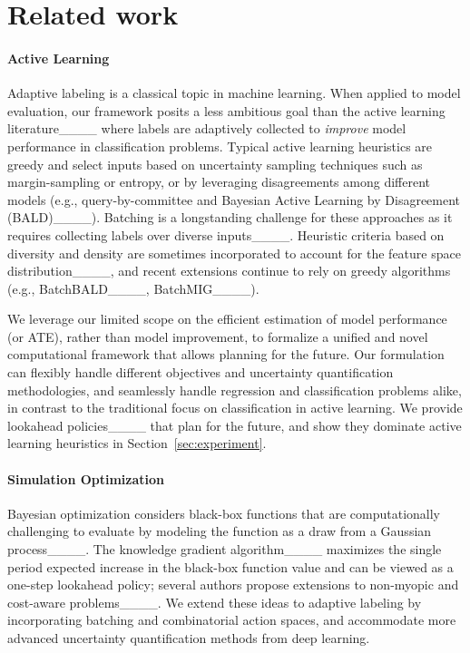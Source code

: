 \section{Related work}
\label{sec:related-work}

\paragraph{Active Learning} Adaptive labeling is a classical topic in machine learning.
When applied to model evaluation, our framework posits a less  ambitious goal than the active learning literature____ where labels are adaptively collected  to \emph{improve} model performance in classification problems. Typical active learning heuristics are greedy and select inputs based on uncertainty sampling techniques such as margin-sampling or entropy, or by leveraging disagreements among different models (e.g., query-by-committee and Bayesian Active Learning by Disagreement (BALD)____). 
Batching is a longstanding challenge for these approaches as it requires collecting labels over diverse inputs____. Heuristic criteria based on diversity and density are sometimes incorporated to account for the feature space distribution____,  and recent extensions continue to rely on greedy algorithms (e.g., BatchBALD____, BatchMIG____).

We leverage our limited scope on the efficient estimation of model performance (or ATE), rather than model improvement, 
to formalize a unified and novel computational framework that allows planning for the future.
Our formulation can flexibly handle different objectives and uncertainty quantification methodologies, and seamlessly handle regression and classification problems alike, in contrast to the traditional focus on classification in active learning.
We provide lookahead policies____ that plan for the future, and show they dominate active learning heuristics in Section~\ref{sec:experiment}.

\paragraph{Simulation Optimization}
Bayesian optimization considers black-box functions that are computationally challenging to 
evaluate by modeling the function as a draw from a Gaussian process____. 
The knowledge gradient algorithm____
maximizes the single period expected increase in the black-box function value and can be viewed as a one-step lookahead policy; several authors propose extensions to non-myopic and cost-aware problems____.
We extend these ideas to adaptive labeling  by incorporating batching and combinatorial action spaces, and accommodate more advanced uncertainty quantification methods from deep learning.

